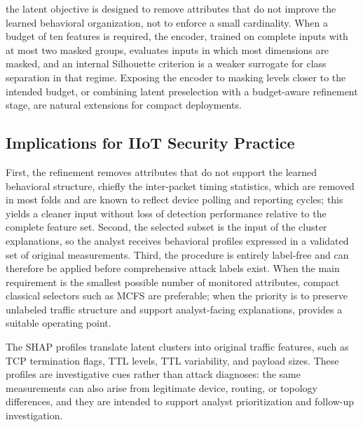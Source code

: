  the latent objective is designed to remove attributes that do not improve the learned behavioral organization, not to enforce a small cardinality. When a budget of ten features is required, the encoder, trained on complete inputs with at most two masked groups, evaluates inputs in which most dimensions are masked, and an internal Silhouette criterion is a weaker surrogate for class separation in that regime. Exposing the encoder to masking levels closer to the intended budget, or combining latent preselection with a budget-aware refinement stage, are natural extensions for compact deployments.

\subsection{Implications for IIoT Security Practice}

 First, the refinement removes attributes that do not support the learned behavioral structure, chiefly the inter-packet timing statistics, which are removed in most folds and are known to reflect device polling and reporting cycles; this yields a cleaner input without loss of detection performance relative to the complete feature set. Second, the selected subset is the input of the cluster explanations, so the analyst receives behavioral profiles expressed in a validated set of original measurements. Third, the procedure is entirely label-free and can therefore be applied before comprehensive attack labels exist. When the main requirement is the smallest possible number of monitored attributes, compact classical selectors such as MCFS are preferable; when the priority is to preserve unlabeled traffic structure and support analyst-facing explanations, \method{} provides a suitable operating point.

The SHAP profiles translate latent clusters into original traffic features, such as TCP termination flags, TTL levels, TTL variability, and payload sizes. These profiles are investigative cues rather than attack diagnoses: the same measurements can also arise from legitimate device, routing, or topology differences, and they are intended to support analyst prioritization and follow-up investigation.

